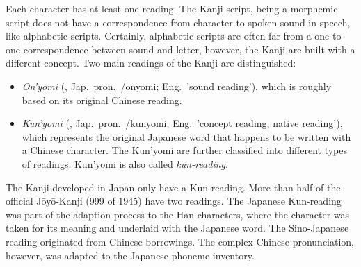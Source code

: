 Each character has at least one reading. The Kanji script, being a morphemic 
script does not have a correspondence from character to spoken sound in speech,
like alphabetic scripts. Certainly, alphabetic scripts are often far from a 
one-to-one correspondence between sound and letter, however, the Kanji are built
with a different concept. Two main readings of the Kanji are distinguished: \\ 
\begin{itemize}
  \item \emph{On'yomi} (, Jap.\ pron.\ /onyomi; 
        Eng.\ 'sound reading'), which is roughly based on its original Chinese 
        reading.

  \item \emph{Kun'yomi} (, Jap.\ pron.\ /kunyomi; 
        Eng.\ 'concept reading, native reading'), which represents the original 
        Japanese word that happens to be written with a Chinese character. 
        The Kun'yomi are further classified into different types of readings.
        Kun'yomi is also called \emph{kun-reading}.
\end{itemize}
The Kanji developed in Japan only have a Kun-reading. 
More than half of the official Jōyō-Kanji (999 of 1945)
have two readings.
The Japanese Kun-reading was part of the adaption process to the Han-characters,
where the character was taken for its meaning and underlaid with the Japanese
word. The Sino-Japanese reading originated from Chinese borrowings. The 
complex Chinese pronunciation, however, was adapted to the Japanese 
phoneme inventory.

